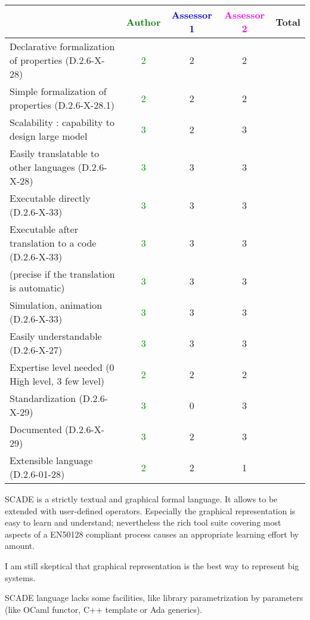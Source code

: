 \begin{tabular}{|l | c | c | c | c|}
\hline
& \textcolor{green}{Author} & \textcolor{blue}{Assessor 1} & \textcolor{magenta}{Assessor 2} & Total \\
\hline
Declarative formalization of properties (D.2.6-X-28) &
\textcolor{green}{2}  & 2 &2 & \\
\hline
Simple formalization of properties (D.2.6-X-28.1) &
\textcolor{green}{2} & 2 &2 & \\
\hline
Scalability : capability to design large model &  \textcolor{green}{3}
& 2 &3 & \\
\hline
Easily translatable to other languages (D.2.6-X-28) &
\textcolor{green}{3}  & 3 &3 & \\
\hline
Executable directly (D.2.6-X-33) & \textcolor{green}{3}  & 3 &3 & \\
\hline
Executable after translation to a code (D.2.6-X-33) &
\textcolor{green}{3}& 3 &3 & \\
(precise if the translation is automatic) &  \textcolor{green}{3}& 3 &3 & \\
\hline
Simulation, animation (D.2.6-X-33) &  \textcolor{green}{3} & 3 &3 & \\
\hline
Easily understandable (D.2.6-X-27) &  \textcolor{green}{3}& 3 &3 & \\
\hline
Expertise level needed (0 High level, 3 few level) &
\textcolor{green}{2} & 2 &2 & \\
\hline
Standardization (D.2.6-X-29) &  \textcolor{green}{3}& 0 &3 & \\
\hline
Documented (D.2.6-X-29) &  \textcolor{green}{3} & 2 &3 & \\
\hline
Extensible language (D.2.6-01-28) &  \textcolor{green}{2}& 2 &1 & \\
\hline
\end{tabular}
\begin{author_comment}
SCADE is a strictly textual and graphical formal language. It allows to be extended with user-defined operators. Especially the graphical representation is easy to learn and understand; nevertheless the rich tool suite covering most aspects of a EN50128 compliant process causes an appropriate learning effort by amount.
\end{author_comment}


\begin{assessor1}
  I am still skeptical that graphical representation is the best way
  to represent big systems.

  SCADE language lacks some facilities, like library parametrization
  by parameters (like OCaml functor, C++ template or Ada generics).
\end{assessor1}

